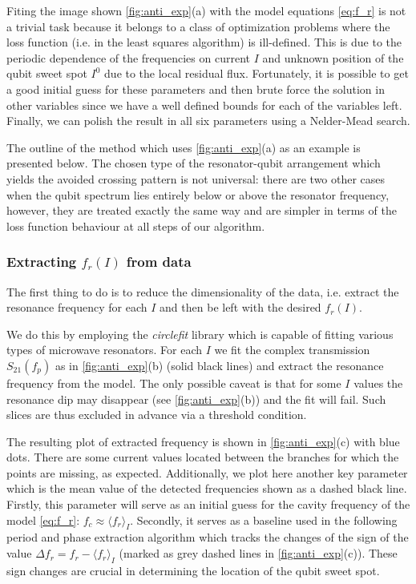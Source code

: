\documentclass[%
 aip,
 amsmath,amssymb,
 reprint,%
]{revtex4-1}
\begin{document}
Fiting the image shown \autoref{fig:anti_exp}(a) with the model equations \eqref{eq:f_r} is not a trivial task because it belongs to a class of optimization problems where the loss function (i.e. in the least squares algorithm) is ill-defined. This is due to the periodic dependence of the frequencies on current $I$ and unknown position of the qubit sweet spot $I^0$ due to the local residual flux. Fortunately, it is possible to get a good initial guess for these parameters and then brute force the solution in other variables since we have a well defined bounds for each of the variables left. Finally, we can polish the result in all six parameters using a Nelder-Mead search.

The outline of the method which uses \autoref{fig:anti_exp}(a) as an example is presented below. The chosen type of the resonator-qubit arrangement which yields the avoided crossing pattern is not universal: there are two other cases when the qubit spectrum lies entirely below or above the resonator frequency, however, they are treated exactly the same way and are simpler in terms of the loss function behaviour at all steps of our algorithm.

\subsubsection{Extracting $f_r(I)$ from data}\label{sec:extract_fr}

The first thing to do is to reduce the dimensionality of the data, i.e. extract the resonance frequency for each $I$ and then be left with the desired $f_r(I)$. 

We do this by employing the \textit{circlefit}\cite{probst2015} library which is capable of fitting various types of microwave resonators. For each $I$ we fit the complex transmission $S_{21}(f_p)$ as in \autoref{fig:anti_exp}(b) (solid black lines) and extract the resonance frequency from the model. The only possible caveat is that for some $I$ values the resonance dip may disappear (see \autoref{fig:anti_exp}(b)) and the fit will fail. Such slices are thus excluded in advance via a threshold condition.

The resulting plot of extracted frequency is shown in \autoref{fig:anti_exp}(c) with blue dots. There are some current values located between the branches for which the points are missing, as expected. Additionally, we plot here another key parameter which is the mean value of the detected frequencies shown as a dashed black line. Firstly, this parameter will serve as an initial guess for the cavity frequency of the model \eqref{eq:f_r}: $f_c \approx \langle f_r \rangle_{I}$.  Secondly, it serves as a baseline used in the following period and phase extraction algorithm which tracks the changes of the sign of the value $\Delta f_r = f_r - \langle f_r \rangle_{I}$ (marked as grey dashed lines in \autoref{fig:anti_exp}(c)). These sign changes are crucial in determining the location of the qubit sweet spot. 
\end{document}
